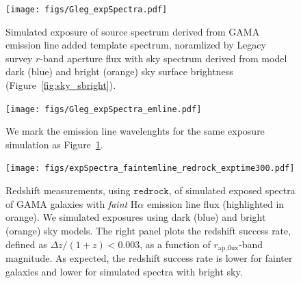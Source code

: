 \documentclass[12pt, letterpaper, preprint]{aastex}
\begin{document}
\begin{figure}
\begin{center}
    \texttt{[image: figs/Gleg\_expSpectra.pdf]}
    \caption{Simulated exposure of source spectrum derived from 
    GAMA emission line added template spectrum, noramlized by Legacy
    survey $r$-band aperture flux with sky spectrum derived from 
    model dark (blue) and bright (orange) sky surface brightness 
    (Figure~\ref{fig:sky_sbright}). 
    }
\label{fig:exp_spectra}
\end{center}
\end{figure}

\begin{figure}
\begin{center}
    \texttt{[image: figs/Gleg\_expSpectra\_emline.pdf]}
    \caption{We mark the emission line wavelenghts for the same exposure 
    simulation as Figure~\ref{fig:exp_spectra}.}
\label{fig:exp_spectra_emline}
\end{center}
\end{figure}

\begin{figure}
\begin{center}
    \texttt{[image: figs/expSpectra\_faintemline\_redrock\_exptime300.pdf]} 
    \caption{Redshift measurements, using $\mathtt{redrock}$, of simulated exposed 
    spectra of GAMA galaxies with \emph{faint} H$\alpha$ emission line flux 
    (highlighted in orange). We simulated exposures using dark (blue) and bright
    (orange) sky models. The right panel plots the redshift success rate, defined as 
    $\Delta z/(1+z) < 0.003$, as a function of $r_\mathrm{ap.flux}$-band magnitude. 
    As expected, the redshift success rate is lower for fainter galaxies and 
    lower for simulated spectra with bright sky.}
\label{fig:exp_spectra_emline}
\end{center}
\end{figure}

%
\end{document}
